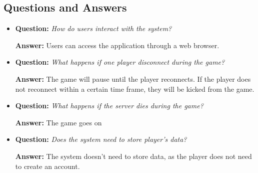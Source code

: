 \documentclass{scrartcl}
\begin{document}
\subsection{Questions and Answers}\label{questions-and-answers}
\begin{itemize}
  \item \textbf{Question:} \emph{How do users interact with the system?}\par
        \textbf{Answer:} Users can access the application through a web browser.
  \item \textbf{Question:} \emph{What happens if one player disconnect during the game?}\par
        \textbf{Answer:} The game will pause until the player reconnects. If the player does not reconnect within a certain time frame, they will be kicked from the game.
  \item \textbf{Question:} \emph{What happens if the server dies during the game?}\par
        \textbf{Answer:} The game goes on
  \item \textbf{Question:} \emph{Does the system need to store player's data?}\par
        \textbf{Answer:} The system doesn't need to store data, as the player does not need to create an account.
\end{itemize}
\end{document}
